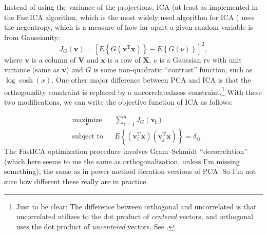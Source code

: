\documentclass{article}
\newcommand{\transpose}{^\mathrm{T}}
\begin{document}
Instead of using the variance of the projections, ICA (at least as implemented in the FastICA algorithm, which is the most widely used algorithm for ICA \cite{hyvarinen_fast_1999,hyvarinen_independent_2000}) uses the negentropy, which is a measure of how far apart a given random variable is from Gaussianity: 
\begin{equation}
J_G \left( \mathbf{v}\right) = \left[ E \left\lbrace G \left( \mathbf{v}\transpose \mathbf{x}\right) \right\rbrace - E \left\lbrace G \left( \nu \right) \right\rbrace \right]^2,
\end{equation}
where $\mathbf{v}$ is a column of $\mathbf{V}$ and $\mathbf{x}$ is a row of $\mathbf{X}$,  $\nu$ is a Gaussian rv with unit variance (same as $\mathbf{v}$) and $G$ is some non-quadratic  ``contrast'' function, such as $\log \cosh (x)$. One other major difference between PCA and ICA is that the orthogonality constraint is replaced by a uncorrelatedness constraint.\footnote{Just to be clear: The difference between orthogonal and uncorrelated is that uncorrelated utilizes to the dot product of \textit{centered} vectors, and orthogonal uses the dot product of \textit{uncentered} vectors.  See \cite{rodgers_linearly_1984}.}  With these two modifications, we can write the objective function of ICA as follows:

 \begin{equation}
\begin{aligned}
&\underset{\mathbf{v}}{\text{maximize}} && \sum_{i=1}^n J_G \left( \mathbf{v_i} \right) \\ 
& \text{subject to} & & E \left\lbrace \left( \mathbf{v}_i\transpose \mathbf{x} \right) \left( \mathbf{v}_j\transpose \mathbf{x} \right) \right\rbrace = \delta_{ij}
\end{aligned}
\end{equation}
The FastICA optimization procedure involves Gram--Schmidt ``decorrelation'' (which here seems to me the same as orthogonalization, unless I'm missing something), the same as in power method iteration versions of PCA.  So I'm not sure how different these really are in practice.



\end{document}
